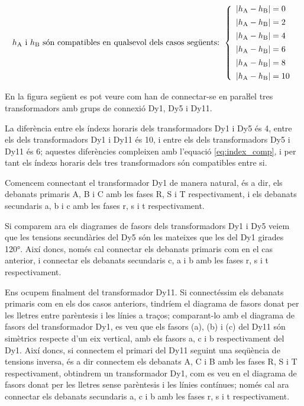 \begin{equation}
    h_\mathrm{A} \text{ i } h_\mathrm{B} \text{ són compatibles en qualsevol dels casos següents: }
    \left\{
        \begin{array}{l}
           |h_\mathrm{A} - h_\mathrm{B}| = 0 \\[1ex]
           |h_\mathrm{A} - h_\mathrm{B}| = 2 \\[1ex]
           |h_\mathrm{A} - h_\mathrm{B}| = 4 \\[1ex]
           |h_\mathrm{A} - h_\mathrm{B}| = 6 \\[1ex]
           |h_\mathrm{A} - h_\mathrm{B}| = 8 \\[1ex]
           |h_\mathrm{A} - h_\mathrm{B}| = 10
        \end{array}
    \right.
    \label{eq:index_comp}
\end{equation}


\begin{exemple}
    En la figura següent es pot veure com han de connectar-se en paraŀlel tres transformadors amb grups de connexió Dy1, Dy5 i Dy11.

      La diferència entre els índexs horaris dels transformadors Dy1 i Dy5 és 4, entre els dels transformadors Dy1 i Dy11 és 10, i entre els dels transformadors Dy5 i Dy11 és 6; aquestes diferències compleixen amb l'equació \eqref{eq:index_comp}, i per tant els índexs horaris dels tres transformadors són compatibles entre si.


    Comencem connectant el  transformador Dy1 de manera natural, és a dir, els debanats primaris A, B i C amb les fases R, S i T respectivament, i els debanats secundaris a, b i c amb les fases r, s i t respectivament.

   \begin{center}
        
    \end{center}

    Si comparem ara els diagrames de fasors dels transformadors Dy1 i Dy5 veiem que les tensions secundàries del Dy5 són les mateixes que les del Dy1 girades \ang{120}. Així doncs, només  cal connectar els debanats primaris com en el cas anterior, i connectar els debanats secundaris c, a i b amb les fases r, s i t respectivament.


    Ens ocupem finalment del transformador Dy11. Si connectéssim els debanats primaris com en els dos casos anteriors, tindríem el diagrama de fasors donat per les lletres entre parèntesis i les línies a traços; comparant-lo amb el diagrama de fasors del transformador Dy1, es veu que els fasors (a), (b) i (c) del Dy11 són simètrics respecte d'un eix vertical, amb els fasors a, c i b respectivament del Dy1. Així doncs, si connectem el primari del Dy11 seguint una seqüència de tensions inversa, és a dir connectem els debanats A, C i B amb les fases R, S i T respectivament, obtindrem un transformador Dy1, com es veu en el diagrama de fasors donat per les lletres sense parèntesis i les línies contínues; només cal ara connectar els debanats secundaris a, c i b amb les fases r, s i t respectivament.
\end{exemple}

